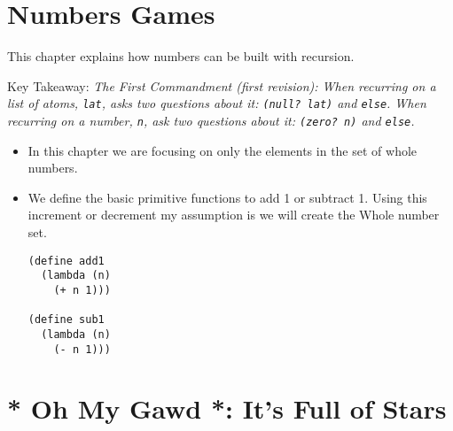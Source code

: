 \documentclass[11pt]{article}
\begin{document}
\newpage

\section{Numbers Games}
\label{sec:orgb5bf20a}

This chapter explains how numbers can be built with recursion.

\vspace{1em}

Key Takeaway:
\emph{The First Commandment (first revision): When recurring on a list of atoms, \texttt{lat}, asks two questions about it: \texttt{(null? lat)} and \texttt{else}. When
recurring on a number, \texttt{n}, ask two questions about it: \texttt{(zero? n)} and \texttt{else}.}


\vspace{1em}

\begin{itemize}
\item In this chapter we are focusing on only the elements in the set of whole numbers.
\item We define the basic primitive functions to add 1 or subtract 1. Using this increment or decrement my assumption is we will create the Whole
number set.
\begin{verbatim}
(define add1
  (lambda (n)
    (+ n 1)))

(define sub1
  (lambda (n)
    (- n 1)))

\end{verbatim}
\end{itemize}








































\newpage

\section{* Oh My Gawd *: It's Full of Stars}
\label{sec:org7383879}
\end{document}
